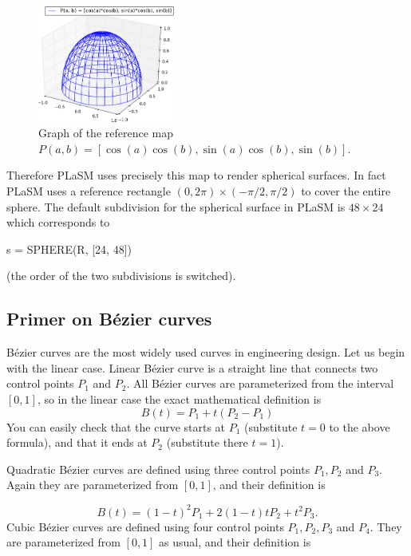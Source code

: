 \begin{figure}[!ht]
\begin{center}
\includegraphics[width=0.4\textwidth]{img/paramsu8.png}
\end{center}
\vspace{-6mm}
\caption{Graph of the reference map $P(a, b) = \left[\cos(a)\cos(b), \sin(a)\cos(b), \sin(b)\right]$.}
\label{fig:paramsu8}
\vspace{-1cm}
\end{figure}
\newpage
\noindent
Therefore PLaSM uses precisely this map to 
render spherical surfaces. In fact PLaSM uses a reference rectangle $(0, 2\pi)\times(-\pi/2, \pi/2)$
to cover the entire sphere. The default subdivision for the spherical surface in PLaSM
is $48 \times 24$ which corresponds to

\begin{bbox}
s = SPHERE(R, [24, 48])
\end{bbox}
(the order of the two subdivisions is switched).
\subsection{Primer on B\'ezier curves}

B\'ezier curves are the most widely used curves in engineering design. 
Let us begin with the linear case. Linear B\'ezier curve is a straight line that
connects two control points $P_1$ and $P_2$. All B\'ezier curves are parameterized
from the interval $[0, 1]$, so in the linear case the exact mathematical definition is
$$
  B(t) = P_1 + t(P_2 - P_1)
$$ 
You can easily check that the curve starts at $P_1$ (substitute $t = 0$ to the above formula),
and that it ends at $P_2$ (substitute there $t = 1$).

Quadratic B\'ezier curves are defined using three control points $P_1, P_2$ and $P_3$. Again they are
parameterized from $[0, 1]$, and their definition is

$$
  B(t) = (1 - t)^2 P_1 + 2(1 - t)t P_2 + t^2 P_3.
$$ 
Cubic B\'ezier curves are defined using four control points $P_1, P_2, P_3$ and $P_4$. They are
parameterized from $[0, 1]$ as usual, and their definition is

